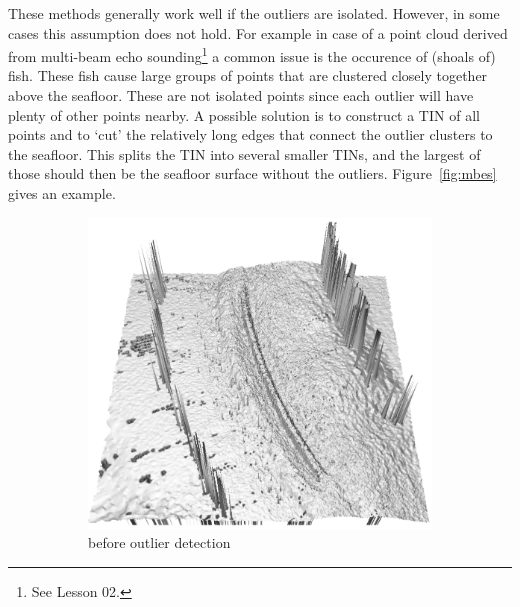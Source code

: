 These methods generally work well if the outliers are isolated.
However, in some cases this assumption does not hold.
For example in case of a point cloud derived from multi-beam echo sounding\footnote{See Lesson 02.} a common issue is the occurence of (shoals of) fish. 
These fish cause large groups of points that are clustered closely together above the seafloor.
These are not isolated points since each outlier will have plenty of other points nearby.
A possible solution is to construct a TIN of all points and to `cut' the relatively long edges that connect the outlier clusters to the seafloor.
This splits the TIN into several smaller TINs, and the largest of those should then be the seafloor surface without the outliers. 
Figure~\ref{fig:mbes} gives an example.
\begin{figure}[htb]
  \centering
  \begin{subfigure}[b]{0.4\linewidth}
    \centering
    \includegraphics[width=\textwidth]{figs/mbes_cleaning_before.png}
    \caption{before outlier detection}
  \end{subfigure}
  \qquad%
  \begin{subfigure}[b]{0.4\linewidth}
    \centering

\end{subfigure}
\end{figure}
